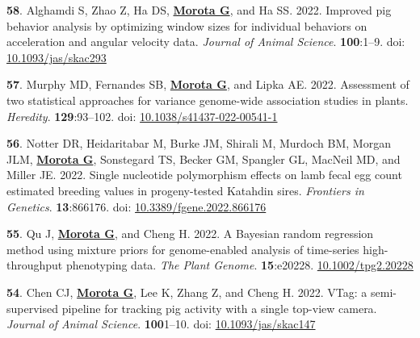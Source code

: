 \documentclass[margin,line,10pt]{res}
\newenvironment{list1}{
  \begin{list}{\ding{113}}{%
      \setlength{\itemsep}{0in}
      \setlength{\parsep}{0in} \setlength{\parskip}{0in}
      \setlength{\topsep}{0in} \setlength{\partopsep}{0in} 
      \setlength{\leftmargin}{0.17in}}}{\end{list}}
\begin{document}
\begin{resume}
\begin{list1}
  \item [{\bf 58}.] Alghamdi S, Zhao Z, Ha DS, \textbf{\underline{Morota G}}, and Ha SS. 2022. Improved pig behavior analysis by optimizing window sizes for individual behaviors on acceleration and angular velocity data. \emph{Journal of Animal Science}. \textbf{100}:1–9. doi: \textcolor{blue}{\href{https://doi.org/10.1093/jas/skac293}{10.1093/jas/skac293}}     

  \vspace{0.5cm}


  \item [{\bf 57}.] Murphy MD, Fernandes SB, \textbf{\underline{Morota G}}, and Lipka AE. 2022. Assessment of two statistical approaches for variance genome-wide association studies in plants. \emph{Heredity}. \textbf{129}:93–102. doi: \textcolor{blue}{\href{https://doi.org/10.1038/s41437-022-00541-1}{10.1038/s41437-022-00541-1}}  


      \vspace{0.5cm}
     
  \item  [{\bf 56}.]  Notter DR, Heidaritabar M, Burke JM, Shirali M, Murdoch BM, Morgan JLM, \textbf{\underline{Morota G}}, Sonstegard TS, Becker GM, Spangler GL, MacNeil MD, and Miller JE. 2022. Single nucleotide polymorphism effects on lamb fecal egg count estimated breeding values in progeny-tested Katahdin sires. \emph{Frontiers in Genetics}. \textbf{13}:866176. doi: \textcolor{blue}{\href{https://doi.org/10.3389/fgene.2022.866176}{10.3389/fgene.2022.866176}}       

        
         
        \vspace{0.5cm}

  \item  [{\bf 55}.] Qu J, \textbf{\underline{Morota G}}, and Cheng H. 2022. A Bayesian random regression method using mixture priors for genome-enabled analysis of time-series high-throughput phenotyping data. \emph{The Plant Genome}. \textbf{15}:e20228. \textcolor{blue}{\href{https://doi.org/10.1002/tpg2.20228}{10.1002/tpg2.20228}}    

  \vspace{0.5cm}


\item [{\bf 54}.]  Chen CJ, \textbf{\underline{Morota G}}, Lee K, Zhang Z, and Cheng H. 2022. VTag: a semi-supervised pipeline for tracking pig activity with a single top-view camera. \emph{Journal of Animal Science}. \textbf{100}1–10. doi: \textcolor{blue}{\href{https://doi.org/10.1093/jas/skac147}{10.1093/jas/skac147}}  


\end{list1}
\end{resume}
\end{document}
